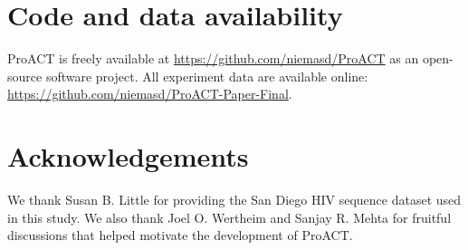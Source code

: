 \documentclass[a4paper,11pt]{article}
\begin{document}
\section{Code and data availability}
ProACT is freely available at \url{https://github.com/niemasd/ProACT} as an open-source software project.
All experiment data are available online: \url{https://github.com/niemasd/ProACT-Paper-Final}.


\section{Acknowledgements}
We thank Susan B. Little for providing the San Diego HIV sequence dataset used in this study.
We also thank Joel O. Wertheim and Sanjay R. Mehta for fruitful discussions that helped motivate the development of ProACT.



\bigskip\bigskip

\printbibliography
\end{document}
